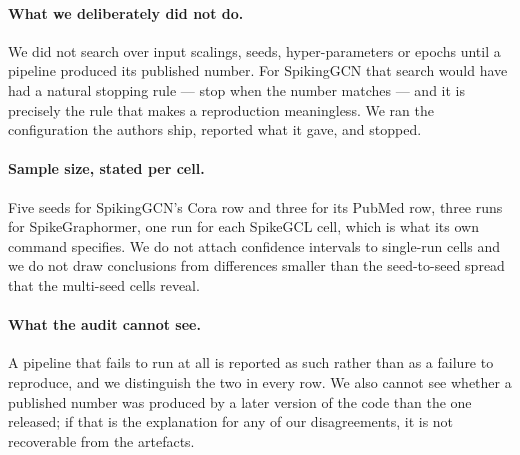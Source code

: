 \paragraph{What we deliberately did not do.} We did not search over input scalings, seeds,
hyper-parameters or epochs until a pipeline produced its published number. For SpikingGCN that search
would have had a natural stopping rule --- stop when the number matches --- and it is precisely the
rule that makes a reproduction meaningless. We ran the configuration the authors ship, reported what
it gave, and stopped.

\paragraph{Sample size, stated per cell.} Five seeds for SpikingGCN's Cora row and three for its PubMed row, three runs for
SpikeGraphormer,
one run for each SpikeGCL cell, which is what its own command specifies. We do not attach confidence
intervals to single-run cells and we do not draw conclusions from differences smaller than the
seed-to-seed spread that the multi-seed cells reveal.

\paragraph{What the audit cannot see.} A pipeline that fails to run at all is reported as such rather
than as a failure to reproduce, and we distinguish the two in every row. We also cannot see whether a
published number was produced by a later version of the code than the one released; if that is the
explanation for any of our disagreements, it is not recoverable from the artefacts.

